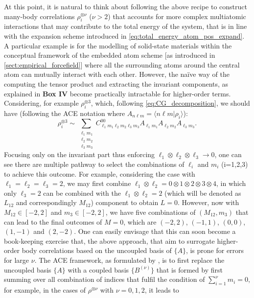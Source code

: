 At this point, it is natural to think about following the above recipe to construct many-body correlations $\rho^{\otimes \nu}_i$ ($\nu>2$) that accounts for more complex multiatomic interactions that may contribute to the total energy of the system, that is in line with the expansion scheme introduced in \cref{eq:total_energy_atom_pos_expand}. A particular example is for the modelling of solid-state materials within the conceptual framework of the embedded atom scheme [as introduced in \cref{sect:empirical_forcefield}] where all the surrounding atoms around the central atom can mutually interact with each other. However, the na\"{i}ve way of the computing the tensor product and extracting the invariant components, as explained in \textbf{Box IV} become practically intractable for higher-order terms. Considering, for example $\rho^{\otimes 3}_i$, which, following \cref{eq:CG_decomposition}, we should have (following the ACE notation where $A_{n\ell m}=\langle n\ell m|\rho_{i}\rangle$):
\begin{equation}
    \label{eq:CG_decomposition_3rd_order}
    \rho^{\otimes 3}_i\sim\sum_{\substack{\ell_1 m_1\\ \ell_2 m_2\\ \ell_3 m_3}}C^{00}_{\ell_1 m_1\ell_2 m_2 \ell_3 m_3}A_{\ell_1 m_1}A_{\ell_2 m_2}A_{\ell_3 m_3}.
\end{equation}
Focusing only on the invariant part thus enforcing $\ell_1\otimes\ell_2\otimes\ell_3\to0$, one can see there are multiple pathway to select the combinations of $\ell_i$ and $m_i$ (i=1,2,3) to achieve this outcome. For example, considering the case with $\ell_1=\ell_2=\ell_3=2$, we may first combine $\ell_1\otimes\ell_2=0\otimes1\otimes2\otimes3\otimes4$, in which only $\ell_3=2$ can be combined with the $\ell_1\otimes\ell_2=2$ (which will be denoted as $L_{12}$ and correspondingly $M_{12}$) component to obtain $L=0$. However, now with $M_{12}\in[-2,2]$ and $m_3\in[-2,2]$, we have five combinations of $(M_{12},m_3)$ that can lead to the final outcomes of $M=0$, which are $(-2,2)$, $(-1,1)$, $(0,0)$, $(1,-1)$ and $(2,-2)$. One can easily envisage that this can soon become a book-keeping exercise that, the above approach, that aim to surrogate higher-order body correlations based on the uncoupled basis of $\{A\}$, is prone for errors for large $\nu$. The ACE framework, as formulated by \citet{drautz2019atomic}, is to first replace the uncoupled basis $\{A\}$ with a coupled basis $\{B^{(\nu)}\}$ that is formed by first summing over all combination of indices that fulfil the condition of $\sum_{i=1}^{\nu}m_{i}=0$, for example, in the cases of $\rho^{\otimes \nu}$ with $\nu=0,1,2$, it leads to 
